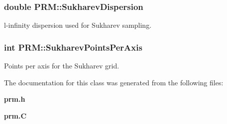 \subsubsection{\setlength{\rightskip}{0pt plus 5cm}double PRM::Sukharev\-Dispersion}\label{classPRM_m5}


l-infinity dispersion used for Sukharev sampling.

\subsubsection{\setlength{\rightskip}{0pt plus 5cm}int PRM::Sukharev\-Points\-Per\-Axis}\label{classPRM_m6}


Points per axis for the Sukharev grid.



The documentation for this class was generated from the following files:\begin{CompactItemize}
\item 
{\bf prm.h}\item 
{\bf prm.C}\end{CompactItemize}
